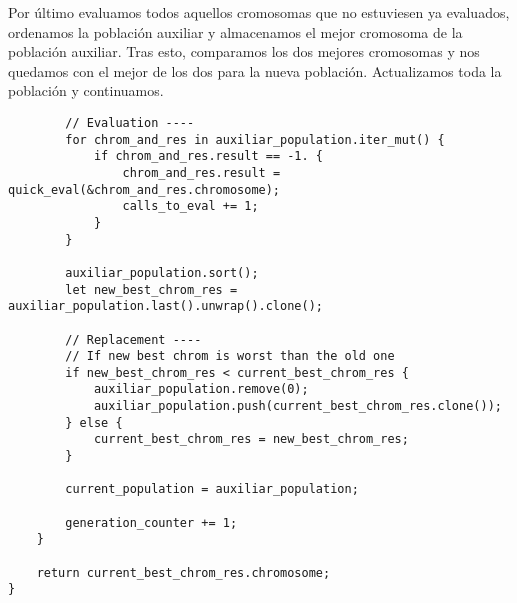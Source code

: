 \documentclass[size=a4, parskip=half, titlepage=false, toc=flat, toc=bib, 12pt]{scrartcl}
\begin{document}
Por último evaluamos todos aquellos cromosomas que no estuviesen ya evaluados, ordenamos la población auxiliar y almacenamos el mejor cromosoma de la población auxiliar. Tras esto, comparamos los dos mejores cromosomas y nos quedamos con el mejor de los dos para la nueva población. Actualizamos toda la población y continuamos.

\begin{verbatim}
        // Evaluation ----
        for chrom_and_res in auxiliar_population.iter_mut() {
            if chrom_and_res.result == -1. {
                chrom_and_res.result = quick_eval(&chrom_and_res.chromosome);
                calls_to_eval += 1;
            }
        }

        auxiliar_population.sort();
        let new_best_chrom_res = auxiliar_population.last().unwrap().clone();

        // Replacement ----
        // If new best chrom is worst than the old one
        if new_best_chrom_res < current_best_chrom_res {
            auxiliar_population.remove(0);
            auxiliar_population.push(current_best_chrom_res.clone());
        } else {
            current_best_chrom_res = new_best_chrom_res;
        }

        current_population = auxiliar_population;

        generation_counter += 1;
    }

    return current_best_chrom_res.chromosome;
}
\end{verbatim}
\end{document}

